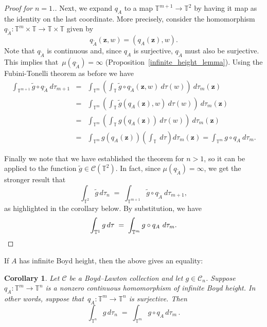 \documentclass[12pt]{amsart}
\theoremstyle{plain}
\newtheorem{corollary}[theorem]{Corollary}
\theoremstyle{definition}
\theoremstyle{remark}
\numberwithin{theorem}{section}
\numberwithin{equation}{section} %
\newcommand{\mc}{\mathcal}
\newcommand{\mb}{\mathbf}
\newcommand{\torus}{{\mathbb{T}}}
\begin{document}
\begin{proof}[Proof for $n=1$.]
Next, we expand $q_A$ to a map $\torus^{m+1} \to \torus^2$ by having it map as the identity on the last coordinate. More precisely,
consider the homomorphism $q_{\tilde A} \colon \torus^m \times \torus \to \torus \times \torus$ given by
$$
q_{\tilde A} (\mb z, w) = \left( q_A(\mb z), w \right).
$$
Note that $q_{\tilde A}$ is continuous and,
since $q_A$ is surjective, $q_{\tilde A}$ must also be surjective.  This implies that~$\mu\left( q_{\tilde A} \right) = \infty$ (Proposition~\ref{infinite_height_lemma}).
Using the  Fubini-Tonelli theorem as before we have
\begin{eqnarray*}
\int_{\torus^{m+1}} \tilde g \circ q_{\tilde A} \ d\tau_{m+1} 
&=& \int_{\torus^m} \left(  \int_{\torus} \tilde g \circ q_{\tilde A} (\mb z, w) \ d\tau (w) \right) \ d\tau_{m} (\mb z) \\
&=& \int_{\torus^m} \left(  \int_{\torus} \tilde g  \left(q_A(\mb z), w\right) \ d\tau (w) \right) \ d\tau_{m} (\mb z) \\
&=& \int_{\torus^m} \left(  \int_{\torus} g  \left(q_A(\mb z)\right) \ d\tau (w) \right) \ d\tau_{m} (\mb z) \\
&=& \int_{\torus^m} g  \left(q_A(\mb z)\right)  \left( \int_{\torus}  \ d\tau \right) d\tau_m  (\mb z)   = \int_{\torus^m} g \circ q_A \ d\tau_m.
\end{eqnarray*}

Finally we note that we have established the theorem for $n>1$, so it can be applied to the function $\tilde g \in \mc C(\torus^2)$.
In fact, since   $\mu\left( q_{\tilde A} \right) = \infty$, we get the stronger result that
$$
 \int_{\torus^{2}} \tilde g \, d \tau_{n}
 \;  = \; 
\int_{\torus^{m+1}} \tilde g \circ q_{\tilde A} \ d \tau_{m+1},
$$
as highlighted in the corollary below.
By substitution, we have
\[
 \int_{\torus^{1}} g \, d \tau
 \;  = \; 
\int_{\torus^{m}} g \circ q_{A} \ d \tau_{m}. \qedhere\]
\end{proof} 

If $A$ has infinite Boyd height, then the above gives an equality:

\begin{corollary}  \label{cor_mt}
Let $\mc C$ be a Boyd--Lawton collection and let $g \in \mc C_n$.
Suppose $q_A \colon \torus^m \to \torus^n$ is a nonzero continuous homomorphism of infinite Boyd height. In other words, suppose 
that~$q_A \colon \torus^m \to \torus^n$ is surjective.
Then
$$
 \int_{\torus^{n}} g \, d \tau_{n}
 \;  = \; 
\int_{\torus^m} g \circ q_A \, d \tau_m \,.
$$
\end{corollary}
\end{document}
